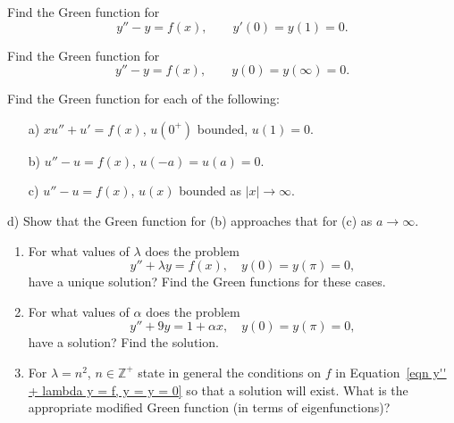 {%
\begin{Exercise}
  \label{exercise y-y=f y0=y1=0}
  Find the Green function for
  \[
  y'' - y = f(x), \qquad y'(0) = y(1) = 0.
  \]

\end{Exercise}



\begin{Exercise}
  \label{exercise y-y=f y0=yinf=0}
  Find the Green function for
  \[
  y'' - y = f(x), \qquad y(0) = y(\infty) = 0.
  \]

\end{Exercise}




\begin{Exercise}
  \label{exercise xu+u=f}
  Find the Green function for each of the following:
  \begin{itemize}
  \item[a)]
    $x u'' + u' = f(x)$, $u(0^+)$ bounded, $u(1) = 0$.
  \item[b)]
    $u'' - u = f(x)$, $u(-a) = u(a) = 0$.
  \item[c)]
    $u'' - u = f(x)$, $u(x)$ bounded as $|x| \to \infty$.
  \end{itemize}
  d) Show that the Green function for (b) approaches that for (c) as
  $a \to \infty$.

\end{Exercise}




\begin{Exercise}
  \label{exercise y+lambday=f}
  \begin{enumerate}
  \item
    For what values of $\lambda$ does the problem 
    \begin{equation}
      \label{eqn y'' + lambda y = f, y = y = 0}
      y'' + \lambda y = f(x), \quad y(0) = y(\pi) = 0,
    \end{equation}
    have a unique solution?  Find the Green functions for these cases.
  \item
    For what values of $\alpha$ does the problem
    \[
    y'' + 9 y = 1 + \alpha x, \quad
    y(0) = y(\pi) = 0,
    \]
    have a solution?  Find the solution.
  \item
    For $\lambda = n^2$, $n \in \mathbb{Z}^+$
    state in general the conditions on $f$ 
    in Equation~\ref{eqn y'' + lambda y = f, y = y = 0}
    so that a solution will exist. 
    What is the appropriate modified Green function 
    (in terms of eigenfunctions)? 
  \end{enumerate}


\end{Exercise}}
